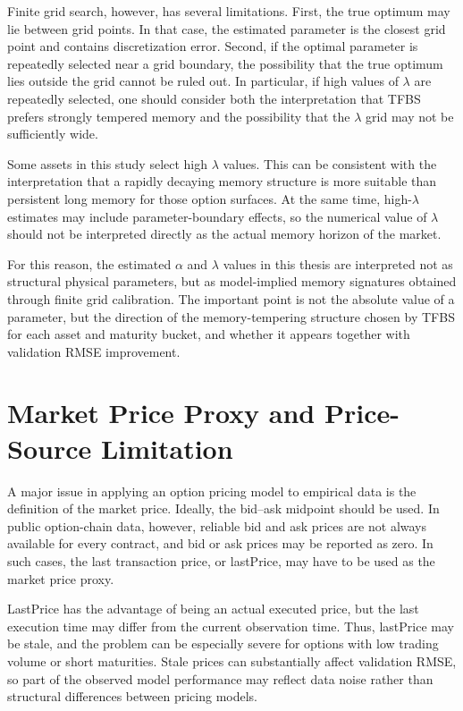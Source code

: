 \documentclass[11pt,a4paper]{report}
\begin{document}
Finite grid search, however, has several limitations. First, the true optimum may lie between grid points. In that case, the estimated parameter is the closest grid point and contains discretization error. Second, if the optimal parameter is repeatedly selected near a grid boundary, the possibility that the true optimum lies outside the grid cannot be ruled out. In particular, if high values of $\lambda$ are repeatedly selected, one should consider both the interpretation that TFBS prefers strongly tempered memory and the possibility that the $\lambda$ grid may not be sufficiently wide.

Some assets in this study select high $\lambda$ values. This can be consistent with the interpretation that a rapidly decaying memory structure is more suitable than persistent long memory for those option surfaces. At the same time, high-$\lambda$ estimates may include parameter-boundary effects, so the numerical value of $\lambda$ should not be interpreted directly as the actual memory horizon of the market.

For this reason, the estimated $\alpha$ and $\lambda$ values in this thesis are interpreted not as structural physical parameters, but as model-implied memory signatures obtained through finite grid calibration. The important point is not the absolute value of a parameter, but the direction of the memory-tempering structure chosen by TFBS for each asset and maturity bucket, and whether it appears together with validation RMSE improvement.

\section{Market Price Proxy and Price-Source Limitation}

A major issue in applying an option pricing model to empirical data is the definition of the market price. Ideally, the bid--ask midpoint should be used. In public option-chain data, however, reliable bid and ask prices are not always available for every contract, and bid or ask prices may be reported as zero. In such cases, the last transaction price, or lastPrice, may have to be used as the market price proxy.

LastPrice has the advantage of being an actual executed price, but the last execution time may differ from the current observation time. Thus, lastPrice may be stale, and the problem can be especially severe for options with low trading volume or short maturities. Stale prices can substantially affect validation RMSE, so part of the observed model performance may reflect data noise rather than structural differences between pricing models.
\end{document}
